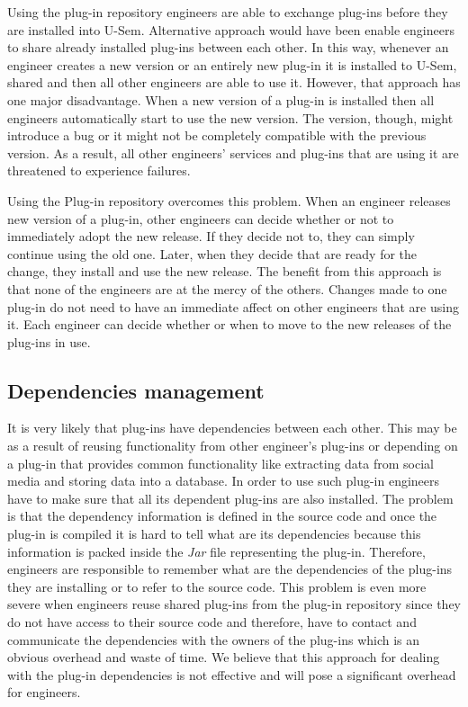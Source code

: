 Using the plug-in repository engineers are able to exchange plug-ins before they are installed into U-Sem. Alternative approach would have been enable engineers to share already installed plug-ins between each other. In this way, whenever an engineer creates a new version or an entirely new plug-in it is installed to U-Sem, shared and then all other engineers are able to use it. However, that approach has one major disadvantage. When a new version of a plug-in is installed then all engineers automatically start to use the new version. The version, though, might introduce a bug or it might not be completely compatible with the previous version. As a result, all other engineers' services and plug-ins that are using it are threatened to experience failures. 

Using the Plug-in repository overcomes this problem. When an engineer releases new version of a plug-in, other engineers can decide whether or not to immediately adopt the new release. If they decide not to, they can simply continue using the old one. Later, when they decide that are ready for the change, they install and use the new release. The benefit from this approach is that none of the engineers are at the mercy of the others. Changes made to one plug-in do not need to have an immediate affect on other engineers that are using it. Each engineer can decide whether or when to move to the new releases of the plug-ins in use.

\subsection{Dependencies management}

It is very likely that plug-ins have dependencies between each other. This may be as a result of reusing functionality from other engineer's plug-ins or depending on a plug-in that provides common functionality like extracting data from social media and storing data into a database. In order to use such plug-in engineers have to make sure that all its dependent plug-ins are also installed. The problem is that the dependency information is defined in the source code and once the plug-in is compiled it is hard to tell what are its dependencies because this information is packed inside the \textit{Jar} file representing the plug-in. Therefore, engineers are responsible to remember what are the dependencies of the plug-ins they are installing or to refer to the source code. This problem is even more severe when engineers reuse shared plug-ins from the plug-in repository since they do not have access to their source code and therefore, have to contact and communicate the dependencies with the owners of the plug-ins which is an obvious overhead and waste of time. We believe that this approach for dealing with the plug-in dependencies is not effective and will pose a significant overhead for engineers.

